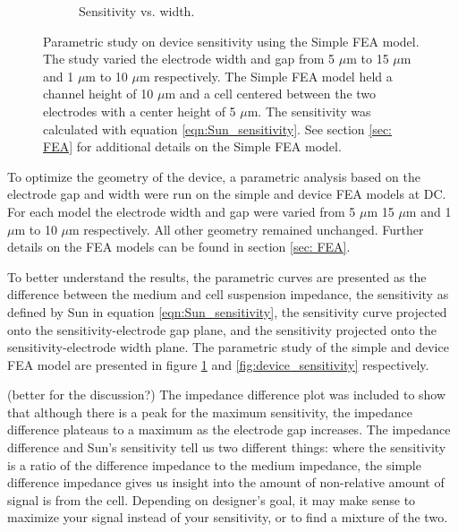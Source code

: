 \begin{figure}[h]
\begin{subfigure}[t]{0.49\textwidth}
        \caption{Sensitivity vs. width.}
    \end{subfigure}
    \caption[Simple FEA model sensitivity]{Parametric study on device sensitivity using the Simple FEA model. The study varied the electrode width and gap from 5 $\mu$m to 15 $\mu$m and 1 $\mu$m to 10 $\mu$m respectively. The Simple FEA model held a channel height of 10 $\mu$m and a cell centered between the two electrodes with a center height of 5 $\mu$m. The sensitivity was calculated with equation \ref{eqn:Sun_sensitivity}. See section \ref{sec: FEA} for additional details on the Simple FEA model.} 
    \label{fig:simple_sensitivity}
\end{figure}

\par To optimize the geometry of the device, a parametric analysis based on the electrode gap and width were run on the simple and device FEA models at DC. For each model the electrode width and gap were varied from 5 $\mu$m 15 $\mu$m and 1 $\mu$m to 10 $\mu$m respectively. All other geometry remained unchanged. Further details on the FEA models can be found in section \ref{sec: FEA}.

\par To better understand the results, the parametric curves are presented as the difference between the medium and cell suspension impedance, the sensitivity as defined by Sun in equation \ref{eqn:Sun_sensitivity}, the sensitivity curve projected onto the sensitivity-electrode gap plane, and the sensitivity projected onto the sensitivity-electrode width plane. The parametric study of the simple and device FEA model are presented in figure \ref{fig:simple_sensitivity} and \ref{fig:device_sensitivity} respectively.

\par (better for the discussion?) The impedance difference plot was included to show that although there is a peak for the maximum sensitivity, the impedance difference plateaus to a maximum as the electrode gap increases. The impedance difference and Sun's sensitivity tell us two different things: where the sensitivity is a ratio of the difference impedance to the medium impedance, the simple difference impedance gives us insight into the amount of non-relative amount of signal is from the cell. Depending on designer's goal, it may make sense to maximize your signal instead of your sensitivity, or to find a mixture of the two. 

